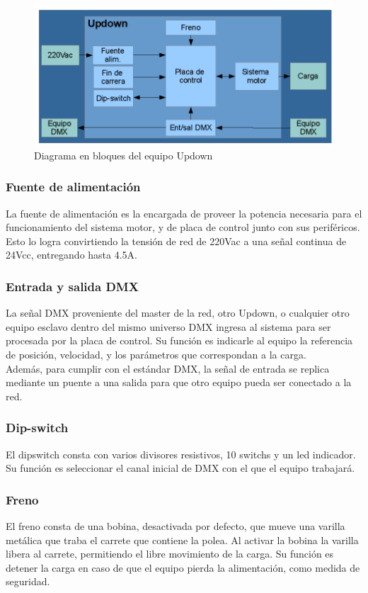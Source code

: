 \begin{figure}[!ht]
	\centering
	\includegraphics[width=15cm,scale=1]{resources/1_10-diagramaBasicoUpdown.png}
	\caption{Diagrama en bloques del equipo Updown}
	\label{fig:\thefigure}
\end{figure}

\subsubsection{Fuente de alimentación}
La fuente de alimentación es la encargada de proveer la potencia necesaria para el funcionamiento del sistema motor, y de placa de control junto con sus periféricos. Esto lo logra convirtiendo la tensión de red de 220Vac a una señal continua de 24Vcc, entregando hasta 4.5A.

\subsubsection{Entrada y salida DMX}
La señal DMX proveniente del master de la red, otro Updown, o cualquier otro equipo esclavo dentro del mismo universo DMX ingresa al sistema para ser procesada por la placa de control. Su función es indicarle al equipo la referencia de posición, velocidad, y los parámetros que correspondan a la carga.\\
Además, para cumplir con el estándar DMX, la señal de entrada se replica mediante un puente a una salida para que otro equipo pueda ser conectado a la red.

\subsubsection{Dip-switch}
El dipswitch consta con varios divisores resistivos, 10 switchs y un led indicador. Su función es seleccionar el canal inicial de DMX con el que el equipo trabajará.

\subsubsection{Freno}
El freno consta de una bobina, desactivada por defecto, que mueve una varilla metálica que traba el carrete que contiene la polea. Al activar la bobina la varilla libera al carrete, permitiendo el libre movimiento de la carga. Su función es detener la carga en caso de que el equipo pierda la alimentación, como medida de seguridad.

